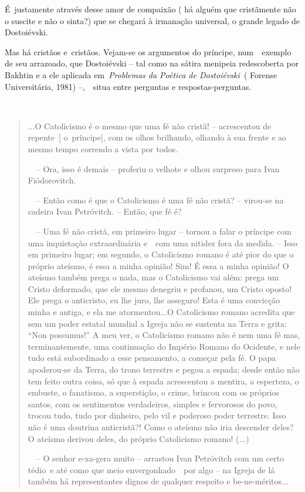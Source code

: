 É~justamente através desse amor de compaixão ( há alguém que cristãmente
não o suscite e não o sinta?) que se chegará à irmanação universal, o
grande legado de Dostoiévski.

Mas há cristãos e~cristãos. Vejam-se os argumentos do príncipe,
num~~exemplo de seu arrazoado, que Dostoiévski -- tal como na sátira
menipeia redescoberta por Bakhtin e a ele aplicada em~\emph{Problemas da
Poética de Dostoiévski~}( Forense Universitária, 1981) --,~~situa entre
perguntas e respostas-perguntas.

\emph{~}

\begin{quote}
...O Catolicismo é o mesmo que uma fé não cristã! -- acrescentou de
repente~{[} o~príncipe{]}, com os olhos brilhando, olhando à sua frente
e ao mesmo tempo correndo a vista por todos.

~~-- Ora, isso é demais -- proferiu o velhote e olhou surpreso para Ivan
Fiódorovitch.

~~-- Então como é que o Catolicismo é uma fé não cristã? -- virou-se na
cadeira Ivan Petróvitch. -- Então, que fé é?

~~-- Uma fé não cristã, em primeiro lugar -- tornou a falar o príncipe
com uma inquietação extraordinária e~~com uma nitidez fora da medida. --
Isso em primeiro lugar; em segundo, o Catolicismo romano é até pior do
que o próprio ateísmo, é essa a minha opinião! Sim! É essa a minha
opinião! O ateísmo também prega o nada, mas o Catolicismo vai além:
prega um Cristo deformado, que ele mesmo denegriu e profanou, um Cristo
oposto! Ele prega o anticristo, eu lhe juro, lhe asseguro! Esta é uma
convicção minha e antiga, e ela me atormentou...O Catolicismo romano
acredita que sem um poder estatal mundial a Igreja não se sustenta na
Terra e grita: ``Non possumus!'' A meu ver, o Catolicismo romano não é
nem uma fé mas, terminantemente, uma continuação do Império Romano do
Ocidente, e nele tudo está subordinado a esse pensamento, a começar pela
fé. O papa apoderou-se da Terra, do trono terrestre e pegou a espada;
desde então não tem feito outra coisa, só que à espada acrescentou a
mentira, a esperteza, o embuste, o fanatismo, a superstição, o crime,
brincou com os próprios santos, com os sentimentos verdadeiros, simples
e fervorosos do povo, trocou tudo, tudo por dinheiro, pelo vil e
poderoso poder terrestre. Isso não é uma doutrina anticristã?! Como o
ateísmo não iria descender deles? O ateísmo derivou deles, do próprio
Catolicismo romano! (...)

~~-- O senhor e-xa-gera muito -- arrastou Ivan Petróvitch com um certo
tédio~e até como que meio envergonhado~~por algo -- na Igreja de lá
também há representantes dignos de qualquer respeito e be-ne-méritos...


\end{quote}
